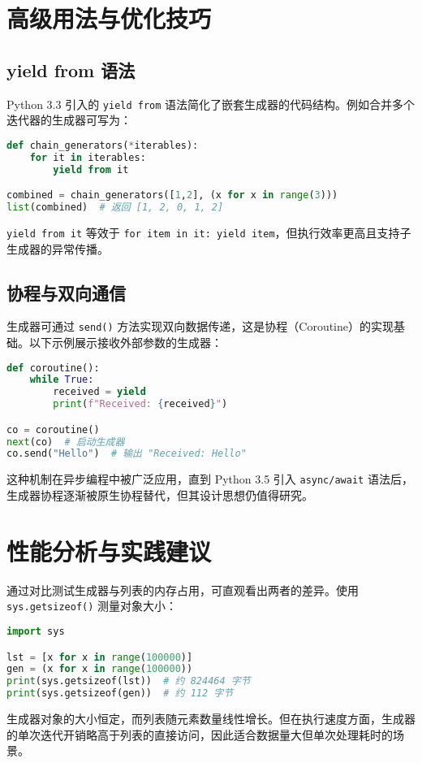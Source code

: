 \chapter{高级用法与优化技巧}
\section{yield from 语法}
Python 3.3 引入的 \verb!yield from! 语法简化了嵌套生成器的代码结构。例如合并多个迭代器的生成器可写为：\par
\begin{lstlisting}[language=python]
def chain_generators(*iterables):
    for it in iterables:
        yield from it

combined = chain_generators([1,2], (x for x in range(3)))
list(combined)  # 返回 [1, 2, 0, 1, 2]
\end{lstlisting}
\verb!yield from it! 等效于 \verb!for item in it: yield item!，但执行效率更高且支持子生成器的异常传播。\par
\section{协程与双向通信}
生成器可通过 \verb!send()! 方法实现双向数据传递，这是协程（Coroutine）的实现基础。以下示例展示接收外部参数的生成器：\par
\begin{lstlisting}[language=python]
def coroutine():
    while True:
        received = yield
        print(f"Received: {received}")

co = coroutine()
next(co)  # 启动生成器
co.send("Hello")  # 输出 "Received: Hello"
\end{lstlisting}
这种机制在异步编程中被广泛应用，直到 Python 3.5 引入 \verb!async/await! 语法后，生成器协程逐渐被原生协程替代，但其设计思想仍值得研究。\par
\chapter{性能分析与实践建议}
通过对比测试生成器与列表的内存占用，可直观看出两者的差异。使用 \verb!sys.getsizeof()! 测量对象大小：\par
\begin{lstlisting}[language=python]
import sys

lst = [x for x in range(100000)]
gen = (x for x in range(100000))
print(sys.getsizeof(lst))  # 约 824464 字节
print(sys.getsizeof(gen))  # 约 112 字节
\end{lstlisting}
生成器对象的大小恒定，而列表随元素数量线性增长。但在执行速度方面，生成器的单次迭代开销略高于列表的直接访问，因此适合数据量大但单次处理耗时的场景。\par
